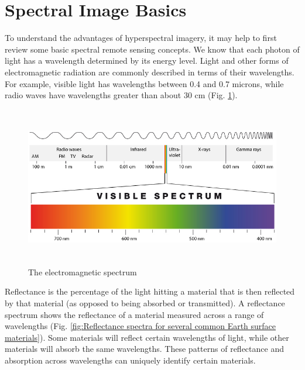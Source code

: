 \documentclass[document.tex]{subfiles}
\begin{document}
\section{Spectral Image Basics}
\noindent To understand the advantages of hyperspectral imagery, it may help to first review some
basic spectral remote sensing concepts. We know that each photon of light has
a wavelength determined by its energy level. Light and other forms of electromagnetic
radiation are commonly described in terms of their wavelengths. For example, visible
light has wavelengths between 0.4 and 0.7 microns, while radio waves have wavelengths
greater than about 30 cm (Fig. \ref{fig:The electromagnetic spectrum}).
\begin{figure}[H]
	\begin{center}
		\includegraphics[height=7.0cm]{imgs/Electromagnetic_spectrum.png}
	\end{center}
	\caption{The electromagnetic spectrum\cite{35}}
	\label{fig:The electromagnetic spectrum}
\end{figure}
\noindent Reflectance is the percentage of the light hitting a material that is then reflected by
that material (as opposed to being absorbed or transmitted). A reflectance spectrum
shows the reflectance of a material measured across a range of wavelengths (Fig. \ref{fig:Reflectance spectra for several common Earth surface materials}).
Some materials will reflect certain wavelengths of light, while other materials will absorb
the same wavelengths. These patterns of reflectance and absorption across wavelengths
can uniquely identify certain materials.
\end{document}

